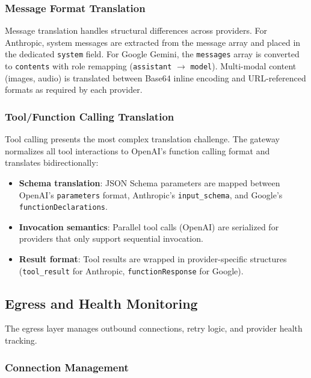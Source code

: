 \subsubsection{Message Format Translation}

Message translation handles structural differences across providers. For Anthropic, system messages are extracted from the message array and placed in the dedicated \texttt{system} field. For Google Gemini, the \texttt{messages} array is converted to \texttt{contents} with role remapping (\texttt{assistant} $\rightarrow$ \texttt{model}). Multi-modal content (images, audio) is translated between Base64 inline encoding and URL-referenced formats as required by each provider.

\subsubsection{Tool/Function Calling Translation}

Tool calling presents the most complex translation challenge. The gateway normalizes all tool interactions to OpenAI's function calling format and translates bidirectionally:

\begin{itemize}[leftmargin=*]
    \item \textbf{Schema translation}: JSON Schema parameters are mapped between OpenAI's \texttt{parameters} format, Anthropic's \texttt{input\_schema}, and Google's \texttt{functionDeclarations}.
    \item \textbf{Invocation semantics}: Parallel tool calls (OpenAI) are serialized for providers that only support sequential invocation.
    \item \textbf{Result format}: Tool results are wrapped in provider-specific structures (\texttt{tool\_result} for Anthropic, \texttt{functionResponse} for Google).
\end{itemize}

\subsection{Egress and Health Monitoring}

The egress layer manages outbound connections, retry logic, and provider health tracking.

\subsubsection{Connection Management}

